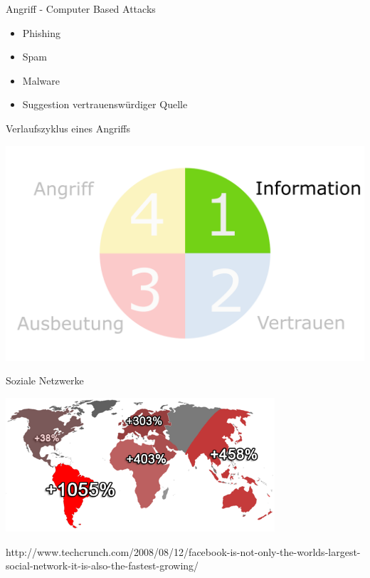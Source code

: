 \documentclass[11pt]{beamer}
\begin{document}
\begin{frame}{Angriff - Computer Based Attacks}
  \begin{itemize}
    \item Phishing
    \item Spam
    \item Malware
    \item Suggestion vertrauenswürdiger Quelle
  \end{itemize}
\end{frame}

\begin{frame}[t]{Verlaufszyklus eines Angriffs}
  \begin{center}
    \includegraphics[height=0.75\textheight]{cycle2}
  \end{center}
\end{frame}

\begin{frame}[t]{Soziale Netzwerke}
  \begin{center}
    \includegraphics[width=0.75\textwidth]{growth}

    {\tiny
    http://www.techcrunch.com/2008/08/12/facebook-is-not-only-the-worlds-largest-social-network-it-is-also-the-fastest-growing/
    }
  \end{center}
\end{frame}
\end{document}
